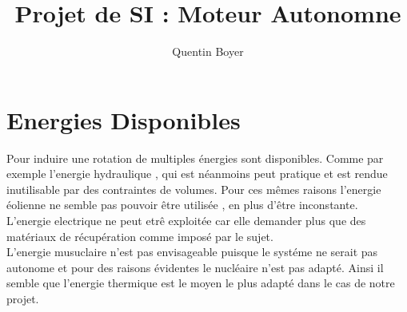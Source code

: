 \documentclass[a4paper,12pt]{article}
\title{Projet de SI : Moteur Autonomne}
\author{Quentin Boyer}
\begin{document}
\maketitle
\tableofcontents

\section{Energies Disponibles}

  Pour induire une rotation de multiples énergies sont disponibles. Comme par exemple l'energie hydraulique , qui est néanmoins peut pratique et est rendue inutilisable par des contraintes de volumes. Pour ces mêmes raisons l'energie éolienne ne semble pas pouvoir être utilisée , en plus d'être inconstante.\\[0.05cm]
  
  L'energie electrique ne peut etrê exploitée car elle demander plus que des matériaux de récupération comme imposé par le sujet.\\[0.05cm]
  
  L'energie musuclaire n'est pas envisageable puisque le systéme ne serait pas autonome et pour des raisons évidentes le nucléaire n'est pas adapté.
  Ainsi il semble que l'energie thermique est le moyen le plus adapté dans le cas de notre projet.\\[0.05cm]
\end{document}
